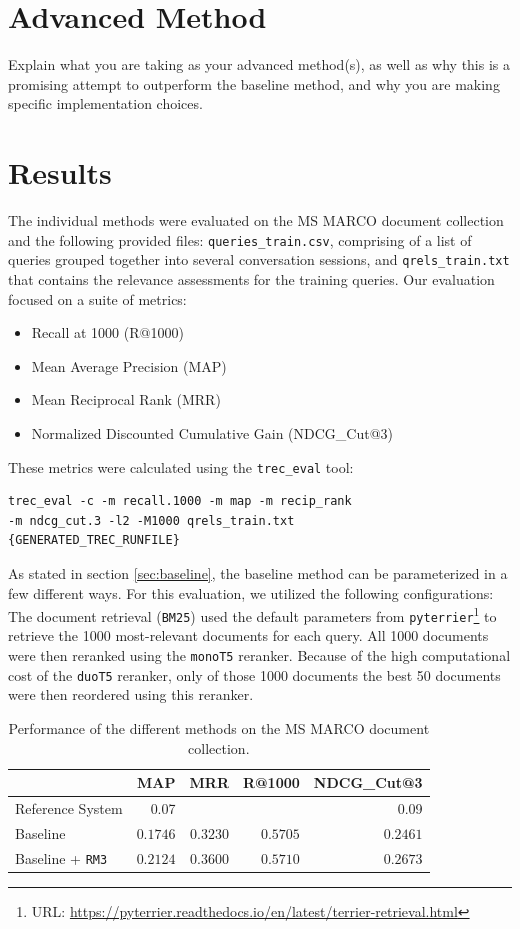 \documentclass[sigconf]{acmart}
\begin{document}
\section{Advanced Method}\label{sec:advanced}
Explain what you are taking as your advanced method(s), as well as why this is a promising attempt to outperform the baseline method, and why you are making specific implementation choices.

\section{Results}\label{sec:results}
The individual methods were evaluated on the MS MARCO document collection and the following provided files: \texttt{queries\-\_\-train\-.csv}, comprising of a list of queries grouped together into several conversation sessions, and \texttt{qrels\-\_\-train\-.txt} that contains the relevance assessments for the training queries. Our evaluation focused on a suite of metrics:
\begin{itemize}
	\item	Recall at 1000 (R@1000)
	\item	Mean Average Precision (MAP)
	\item	Mean Reciprocal Rank (MRR)
	\item	Normalized Discounted Cumulative Gain (NDCG\_Cut@3)
\end{itemize}
These metrics were calculated using the \texttt{trec\_eval} tool:
\begin{verbatim}
trec_eval -c -m recall.1000 -m map -m recip_rank
-m ndcg_cut.3 -l2 -M1000 qrels_train.txt
{GENERATED_TREC_RUNFILE}
\end{verbatim}

As stated in section \ref{sec:baseline}, the baseline method can be parameterized in a few different ways. For this evaluation, we utilized the following configurations: The document retrieval (\texttt{BM25}) used the default parameters from \texttt{pyterrier}\footnote{URL: \url{https://pyterrier.readthedocs.io/en/latest/terrier-retrieval.html}} to retrieve the 1000 most-relevant documents for each query. All 1000 documents were then reranked using the \texttt{monoT5} reranker. Because of the high computational cost of the \texttt{duoT5} reranker, only of those 1000 documents the best 50 documents were then reordered using this reranker.

\begin{table}[h]
\begin{center}
	\caption{Performance of the different methods on the MS MARCO document collection.}
	\begin{tabular}{l|rrrr}
			& MAP & MRR & R@1000 & NDCG\_Cut@3 \\
		\hline
		Reference System & 0.07 &  &  & 0.09 \\
		Baseline & $0.1746$ & $0.3230$ & $0.5705$ & $0.2461$ \\
		Baseline + \texttt{RM3} & $\mathbf{0.2124}$ & $\mathbf{0.3600}$ & $\mathbf{0.5710}$ & $\mathbf{0.2673}$
	\end{tabular}
	\label{table:1}
\end{center}
\end{table}
\end{document}
